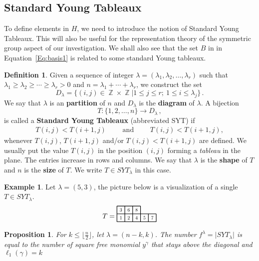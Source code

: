 \documentclass[12pt,reqno]{amsart}
\theoremstyle{plain}
\newtheorem{proposition}[theorem]{Proposition}
\theoremstyle{definition}
\newtheorem{example}[theorem]{Example}
\newtheorem{definition}[theorem]{Definition}
\DeclareMathOperator{\Z}{\mathbb{Z}}
\begin{document}
\subsection{Standard Young Tableaux }\label{ss:standardYoung}
To define elements in $H$, we need to introduce the notion of Standard Young Tableaux. This will also be useful  for the
representation theory of the symmetric group aspect of our investigation. We shall also see that the set $B$ in in Equation~\eqref{Eq:basis1} is related to some standard Young tableaux.  
\begin{definition} Given a sequence of integer $\lambda=(\lambda_1,\lambda_2,\ldots,\lambda_r)$  such that $\lambda_1\ge \lambda_2\ge\cdots\ge\lambda_r >0$ and $n=\lambda_1+\cdots+\lambda_r$, we construct the set 
  $$D_\lambda=\big\{ (i,j)\in \Z\times\Z \big|  1\le j \le r;\ 1\le i \le \lambda_j \big\}\,.$$
We say that $\lambda$ is an {\bf partition} of $n$ and $D_\lambda$ is the {\bf diagram} of $\lambda$. A bijection
  $$T\colon \{1,2,\ldots,n\}\to D_\lambda\,,$$
  is called a {\bf Standard Young Tableaux} (abbreviated SYT) if 
  \begin{align*}
  T(i,j) < T(i+1,j) \qquad \text{ and }\qquad T(i,j) < T(i+1,j),
\end{align*}
whenever $T(i,j)$, $T(i+1,j)$ and/or $T(i,j) < T(i+1,j)$ are defined. We usually put the value $T(i,j)$ in the position $(i,j)$ forming
a {\sl tableau} in the plane. The entries  increase in rows and columns. We say that $\lambda$ is the {\bf shape} of $T$ and $n$ is the {\bf size} of $T$. We write $T\in SYT_\lambda$ in this case.
\end{definition}
\begin{example}\label{ex:tab}
	Let $\lambda=(5,3)$, the picture below is a visualization of a single $T\in SYT_\lambda$.
$$T=
\begin{tikzpicture}[scale = 0.4,baseline=5pt ]
	\draw[solid, thick] (0,0) -- (5,0);
	\draw[solid, thick] (0,1) -- (5,1);
	\draw[solid, thick] (0,2) -- (3,2);
	\draw[solid, thick] (0,0) -- (0,2);
	\draw[solid, thick] (1,0) -- (1,2);
	\draw[solid, thick] (2,0) -- (2,2);
	\draw[solid, thick] (3,0) -- (3,2);
	\draw[solid, thick] (4,0) -- (4,1);
	\draw[solid, thick] (5,0) -- (5,1);
	\node at (.5,.5) [scale=0.7] {$1$}; %
	\node at (1.5,.5) [scale=0.7] {$2$}; %
	\node at (.5,1.5) [scale=0.7] {$3$}; %
	\node at (2.5,.5) [scale=0.7] {$4$}; %
	\node at (3.5,.5) [scale=0.7] {$5$}; %
	\node at (1.5,1.5) [scale=0.7] {$6$}; %
	\node at (4.5,.5) [scale=0.7] {$7$}; %
	\node at (2.5,1.5) [scale=0.7] {$8$}; %
\end{tikzpicture}
$$
\end{example}
\begin{proposition}\label{prop:bijection}
For $k\le \lfloor \frac{n}{2} \rfloor$, let $\lambda=(n-k,k)$.  The number $f^\lambda=\big|SYT_\lambda\big|$ is equal to the number of square free monomial $y^\gamma$ that stays above the diagonal and $\ell_1(\gamma)=k$
\end{proposition}
\end{document}
